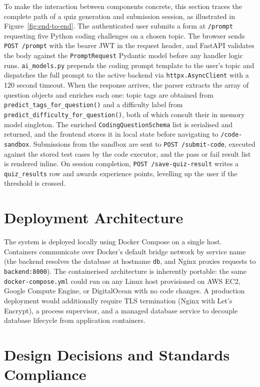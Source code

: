 To make the interaction between components concrete, this section
traces the complete path of a quiz generation and submission session, as illustrated in Figure~\ref{fig:end-to-end}.
The authenticated user submits a form at \texttt{/prompt} requesting
five Python coding challenges on a chosen topic. The browser sends
\texttt{POST /prompt} with the bearer JWT in the request header, and
FastAPI validates the body against the \texttt{PromptRequest} Pydantic
model before any handler logic runs. \texttt{ai\_models.py} prepends
the coding prompt template to the user's topic and dispatches the full
prompt to the active backend via \texttt{httpx.AsyncClient} with a 120
second timeout. When the response arrives, the parser extracts the
array of question objects and enriches each one: topic tags are
obtained from \texttt{predict\_tags\_for\_question()} and a difficulty
label from \texttt{predict\_difficulty\_for\_question()}, both of
which consult their in memory model singleton. The enriched
\texttt{CodingQuestionSchema} list is serialised and returned, and the
frontend stores it in local state before navigating to
\texttt{/code-sandbox}. Submissions from the sandbox are sent to
\texttt{POST /submit-code}, executed against the stored test cases by
the code executor, and the pass or fail result list is rendered inline.
On session completion, \texttt{POST /save-quiz-result} writes a
\texttt{quiz\_results} row and awards experience points, levelling up
the user if the threshold is crossed.

\section{Deployment Architecture}

The system is deployed locally using Docker Compose on a single host.
Containers communicate over Docker's default bridge network by service
name (the backend resolves the database at hostname \texttt{db}, and
Nginx proxies requests to \texttt{backend:8000}). The containerised
architecture is inherently portable: the same \texttt{docker-compose.yml}
could run on any Linux host provisioned on AWS EC2, Google Compute
Engine, or DigitalOcean with no code changes. A production deployment
would additionally require TLS termination (Nginx with Let's Encrypt),
a process supervisor, and a managed database service to decouple
database lifecycle from application containers.

\section{Design Decisions and Standards Compliance}

